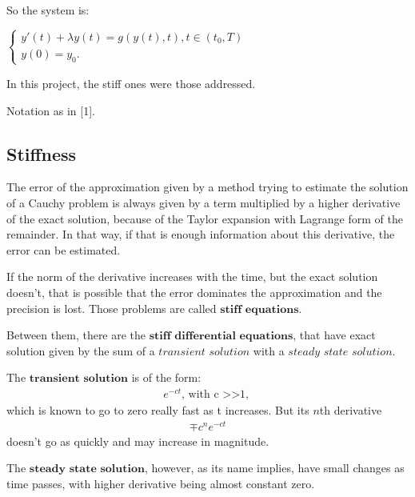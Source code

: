 \documentclass[letterpaper,10pt,english]{jupyterBook}
\begin{document}
\sphinxAtStartPar
So the system is:

\sphinxAtStartPar
\(\begin{cases}
    y'(t) + \lambda y(t) = g(y(t), t), t \in (t_0, T) \\
    y(0) = y_0 
    \text{.}
\end{cases}\)

\sphinxAtStartPar
In this project, the stiff ones were those addressed.

\sphinxAtStartPar
Notation as in {[}1{]}.


\subsection{Stiffness}
\label{\detokenize{cap1:stiffness}}
\sphinxAtStartPar
The error of the approximation given by a method trying to estimate the solution of a Cauchy problem is always given by a term multiplied by a higher derivative of the exact solution, because of the Taylor expansion with Lagrange form of the remainder. In that way, if that is enough information about this derivative, the error can be estimated.

\sphinxAtStartPar
If the norm of the derivative increases with the time, but the exact solution doesn’t, that is possible that the error dominates the approximation and the precision is lost. Those problems are called \(\textbf{stiff equations}\).

\sphinxAtStartPar
Between them, there are the \(\textbf{stiff differential equations}\), that have exact solution given by the sum of a \(\textit{transient solution}\) with a \(\textit{steady state solution}\).

\sphinxAtStartPar
The \(\textbf{transient solution}\) is of the form:
\begin{equation*}
\begin{split}
    e^{-ct} \text{, with c >>1, }
\end{split}
\end{equation*}
\sphinxAtStartPar
which is known to go to zero really fast as t increases. But its \(n\)th derivative
\begin{equation*}
\begin{split}
    \mp c^{n}e^{-ct}
\end{split}
\end{equation*}
\sphinxAtStartPar
doesn’t go as quickly and may increase in magnitude.

\sphinxAtStartPar
The \(\textbf{steady state solution}\), however, as its name implies, have small changes as time passes, with higher derivative being almost constant zero.
\end{document}
